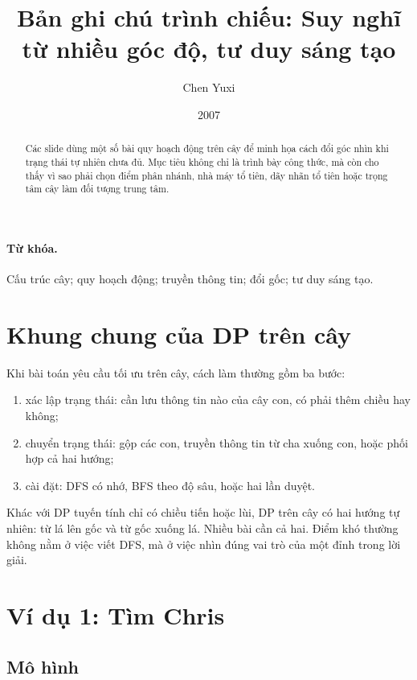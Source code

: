 \documentclass[11pt]{article}
\title{Bản ghi chú trình chiếu: Suy nghĩ từ nhiều góc độ, tư duy sáng tạo}
\author{Chen Yuxi}
\date{2007}
\begin{document}
\maketitle


\begin{abstract}
Các slide dùng một số bài quy hoạch động trên cây để minh họa cách đổi góc
nhìn khi trạng thái tự nhiên chưa đủ. Mục tiêu không chỉ là trình bày công
thức, mà còn cho thấy vì sao phải chọn điểm phân nhánh, nhà máy tổ tiên, dãy
nhãn tổ tiên hoặc trọng tâm cây làm đối tượng trung tâm.
\end{abstract}

\paragraph{Từ khóa.}
Cấu trúc cây; quy hoạch động; truyền thông tin; đổi gốc; tư duy sáng tạo.

\section{Khung chung của DP trên cây}

Khi bài toán yêu cầu tối ưu trên cây, cách làm thường gồm ba bước:
\begin{enumerate}
  \item xác lập trạng thái: cần lưu thông tin nào của cây con, có phải thêm
  chiều hay không;
  \item chuyển trạng thái: gộp các con, truyền thông tin từ cha xuống con,
  hoặc phối hợp cả hai hướng;
  \item cài đặt: DFS có nhớ, BFS theo độ sâu, hoặc hai lần duyệt.
\end{enumerate}

Khác với DP tuyến tính chỉ có chiều tiến hoặc lùi, DP trên cây có hai hướng
tự nhiên: từ lá lên gốc và từ gốc xuống lá. Nhiều bài cần cả hai. Điểm khó
thường không nằm ở việc viết DFS, mà ở việc nhìn đúng vai trò của một đỉnh
trong lời giải.

\section{Ví dụ 1: Tìm Chris}

\subsection{Mô hình}
\end{document}
